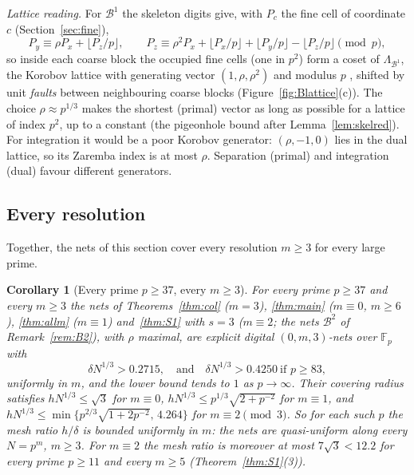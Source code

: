 \documentclass[11pt]{amsart}
\newtheorem{corollary}[theorem]{Corollary}
\theoremstyle{definition}
\theoremstyle{plain}
\newcommand{\F}{\mathbb{F}}
\begin{document}
\emph{Lattice reading.} For $\mathcal B^1$ the skeleton digits give, with $P_c$ the fine cell of coordinate $c$ (Section~\ref{sec:fine}),
\[
P_y\equiv\rho P_x+\lfloor P_z/p\rfloor,\qquad P_z\equiv\rho^2P_x+\lfloor P_x/p\rfloor+\lfloor P_y/p\rfloor-\lfloor P_z/p\rfloor\pmod p,
\]
so inside each coarse block the occupied fine cells (one in $p^2$) form a coset of $\Lambda_{\mathcal B^1}$, the Korobov lattice with generating vector $(1,\rho,\rho^2)$ and modulus $p$ \cite{Kor59,SJ94}, shifted by unit \emph{faults} between neighbouring coarse blocks (Figure~\ref{fig:Blattice}(c)). The choice $\rho\approx p^{1/3}$ makes the shortest (primal) vector as long as possible for a lattice of index $p^2$, up to a constant (the pigeonhole bound after Lemma~\ref{lem:skelred}). For integration it would be a poor Korobov generator: $(\rho,-1,0)$ lies in the dual lattice, so its Zaremba index is at most $\rho$. Separation (primal) and integration (dual) favour different generators.


\subsection{Every resolution}\label{sec:everym}
Together, the nets of this section cover every resolution $m\ge3$ for every large prime.

\begin{corollary}[Every prime $p\ge37$, every $m\ge3$]\label{cor:allm}
For every prime $p\ge37$ and every $m\ge3$ the nets of Theorems~\ref{thm:col} ($m=3$), \ref{thm:main} ($m\equiv0$, $m\ge6$), \ref{thm:allm} ($m\equiv1$) and~\ref{thm:S1} with $s=3$ ($m\equiv2$; the nets $\mathcal B^2$ of Remark~\ref{rem:B2}), with $\rho$ maximal, are explicit digital $(0,m,3)$-nets over $\F_p$ with
\[
\delta N^{1/3}>0.2715,\quad\text{and}\quad\delta N^{1/3}>0.4250\ \text{if } p\ge83,
\]
uniformly in $m$, and the lower bound tends to $1$ as $p\to\infty$. Their covering radius satisfies $hN^{1/3}\le\sqrt3$ for $m\equiv0$, $hN^{1/3}\le p^{1/3}\sqrt{2+p^{-2}}$ for $m\equiv1$, and $hN^{1/3}\le\min\{p^{2/3}\sqrt{1+2p^{-2}},\,4.264\}$ for $m\equiv2\pmod 3$. So for each such $p$ the mesh ratio $h/\delta$ is bounded uniformly in $m$: the nets are quasi-uniform along every $N=p^m$, $m\ge3$. For $m\equiv2$ the mesh ratio is moreover at most $7\sqrt3<12.2$ for every prime $p\ge11$ and every $m\ge5$ (Theorem~\ref{thm:S1}(3)).
\end{corollary}
\end{document}
